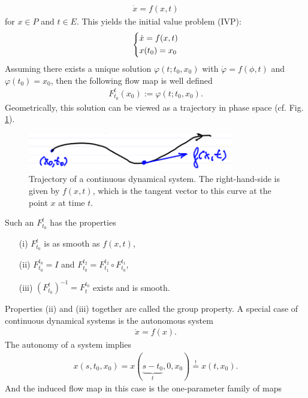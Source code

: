 	\begin{align}
		\boxed{
			\dot{x} = f(x,t)
		}
	\end{align}
	for $x\in P$ and $t \in E$. This yields the initial value problem (IVP):
	\begin{align}
		\begin{dcases}
			\dot{x} = f(x,t) \\
			x(t_0) = x_0
		\end{dcases}
	\end{align}
	Assuming there exists a unique solution $\varphi(t; t_0, x_0)$ with $\dot{\varphi} = f(\phi,t)$ and $\varphi(t_0)= x_0$, then the following flow map is well defined
	\begin{align}
		\boxed{
		F_{t_0}^{t}(x_0) := \varphi(t; t_0, x_0).}
	\end{align}
	Geometrically, this solution can be viewed as a trajectory in phase space (cf. Fig. \ref{fig:intro:2}). 
		\begin{figure}[H]
		\centering
	\includegraphics[width = 0.8\textwidth]{figures/intro/2CDS.png}
	\caption{Trajectory of a continuous dynamical system. The right-hand-side is given by $f(x,t)$, which is the tangent vector to this curve at the point $x$ at time $t$. }
	\label{fig:intro:2}
	\end{figure}
	Such an $F_{t_0}^{t}$ has the properties
	\begin{itemize}
		\item[(i)] $F_{t_0}^{t}$ is as smooth as $f(x,t)$,
		\item[(ii)] $F_{t_0}^{t_0} = I$ and $F_{t_0}^{t_2} = F_{t_1}^{t_2} \circ F_{t_0}^{t_1}$,
		\item[(iii)] $\left(F_{t_0}^{t}\right)^{-1} = F_{t}^{t_0}$ exists and is smooth.
\end{itemize}
Properties (ii) and (iii) together are called the group property. 
A special case of continuous dynamical systems is the autonomous system 
\begin{align}
	\boxed{\dot{x} = f(x).}	
\end{align}
The autonomy of a system implies
\begin{align}
	x(s,t_0, x_0) = x(\underbrace{s-t_0}_{t}, 0, x_0) \stackrel{!}{=} x(t,x_0).
\end{align}
And the induced flow map in this case is the one-parameter family of maps

